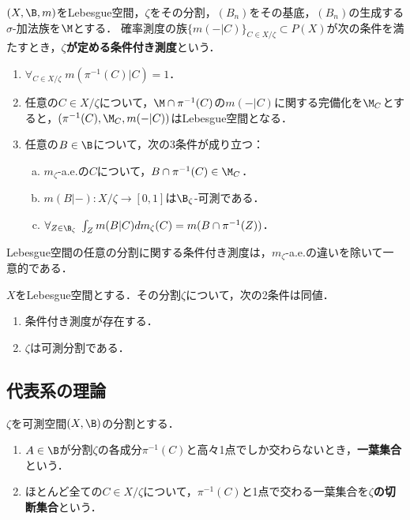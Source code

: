 \documentclass[uplatex,dvipdfmx]{jsreport}
\begin{document}
\begin{definition}
    $(X,\B,m)$をLebesgue空間，$\zeta$をその分割，$(B_n)$をその基底，$(B_n)$の生成する$\sigma$-加法族を$\M$とする．
    確率測度の族$\{m(-|C)\}_{C\in X/\zeta}\subset P(X)$が次の条件を満たすとき，\textbf{$\zeta$が定める条件付き測度}という．
    \begin{enumerate}
        \item $\forall_{C\in X/\zeta}\;m(\pi^{-1}(C)|C)=1$．
        \item 任意の$C\in X/\zeta$について，$\M\cap\pi^{-1}(C)$の$m(-|C)$に関する完備化を$\M_C$とすると，$(\pi^{-1}(C),\M_C,m(-|C))$はLebesgue空間となる．
        \item 任意の$B\in\B$について，次の3条件が成り立つ：
        \begin{enumerate}[(a)]
            \item $m_\zeta$-a.e.の$C$について，$B\cap\pi^{-1}(C)\in\M_C$．
            \item $m(B|-):X/\zeta\to[0,1]$は$\B_\zeta$-可測である．
            \item $\forall_{Z\in\B_\zeta}\;\int_Zm(B|C)dm_\zeta(C)=m(B\cap\pi^{-1}(Z))$．
        \end{enumerate}
    \end{enumerate}
\end{definition}

\begin{proposition}
    Lebesgue空間の任意の分割に関する条件付き測度は，$m_\zeta$-a.e.の違いを除いて一意的である．
\end{proposition}

\begin{proposition}
    $X$をLebesgue空間とする．その分割$\zeta$について，次の2条件は同値．
    \begin{enumerate}
        \item 条件付き測度が存在する．
        \item $\zeta$は可測分割である．
    \end{enumerate}
\end{proposition}

\subsection{代表系の理論}

\begin{definition}
    $\zeta$を可測空間$(X,\B)$の分割とする．
    \begin{enumerate}
        \item $A\in\B$が分割$\zeta$の各成分$\pi^{-1}(C)$と高々1点でしか交わらないとき，\textbf{一葉集合}という．
        \item ほとんど全ての$C\in X/\zeta$について，$\pi^{-1}(C)$と1点で交わる一葉集合を\textbf{$\zeta$の切断集合}という．
    \end{enumerate}
\end{definition}
\end{document}
